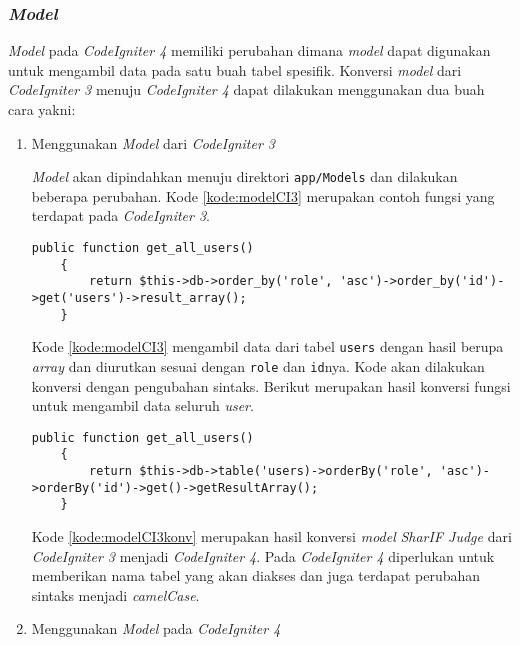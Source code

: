 \subsubsection{\textit{Model}}
\textit{Model} pada \textit{CodeIgniter 4} memiliki perubahan dimana \textit{model} dapat digunakan untuk mengambil data pada satu buah tabel spesifik. Konversi \textit{model} dari \textit{CodeIgniter 3} menuju \textit{CodeIgniter 4} dapat dilakukan menggunakan dua buah cara yakni:
\begin{enumerate}
\item Menggunakan \textit{Model} dari \textit{CodeIgniter 3}

\textit{Model} akan dipindahkan menuju direktori \texttt{app/Models} dan dilakukan beberapa perubahan. Kode \ref{kode:modelCI3} merupakan contoh fungsi yang terdapat pada \textit{CodeIgniter 3}.
\begin{lstlisting}[caption=Contoh fungsi untuk mengambil data seluruh user pada \textit{CodeIgniter 3}, label=kode:modelCI3]
public function get_all_users()
	{
		return $this->db->order_by('role', 'asc')->order_by('id')->get('users')->result_array();
	}
\end{lstlisting}

Kode \ref{kode:modelCI3} mengambil data dari tabel \texttt{users} dengan hasil berupa \textit{array} dan diurutkan sesuai dengan \texttt{role} dan \texttt{id}nya. Kode akan dilakukan konversi dengan pengubahan sintaks. Berikut merupakan hasil konversi fungsi untuk mengambil data seluruh \textit{user}.
\begin{lstlisting}[caption=Hasil konversi fungsi untuk mengambil data seluruh user, label=kode:modelCI3konv]
public function get_all_users()
	{
		return $this->db->table('users)->orderBy('role', 'asc')->orderBy('id')->get()->getResultArray();
	}
\end{lstlisting}
Kode \ref{kode:modelCI3konv} merupakan hasil konversi \textit{model} \textit{SharIF Judge} dari \textit{CodeIgniter 3} menjadi \textit{CodeIgniter 4}. Pada \textit{CodeIgniter 4} diperlukan untuk memberikan nama tabel yang akan diakses dan juga terdapat perubahan sintaks menjadi \textit{camelCase}.

\item Menggunakan \textit{Model} pada \textit{CodeIgniter 4}


\end{enumerate}
